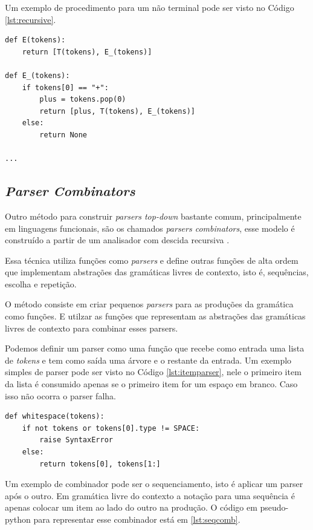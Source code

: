 Um exemplo de procedimento para um não terminal pode ser visto no Código \ref{lst:recursive}.

\begin{lstlisting}[caption=Exemplo de procedimento em pseudo-python para um não terminal,label={lst:recursive}]
def E(tokens):
    return [T(tokens), E_(tokens)]

def E_(tokens):
    if tokens[0] == "+":
        plus = tokens.pop(0)
        return [plus, T(tokens), E_(tokens)]
    else:
        return None

...
\end{lstlisting}


\subsection{\textit{Parser Combinators}}

Outro método para construir \textit{parsers top-down} bastante comum, 
principalmente em linguagens funcionais, são os chamados \textit{parsers combinators},
esse modelo é construído a partir de um analisador com descida recursiva \cite{hutton1996monadic}.

Essa técnica utiliza funções como \textit{parsers} e define outras funções de alta ordem que
implementam abstrações das gramáticas livres de contexto, 
isto é, sequências, escolha e repetição.

O método consiste em criar pequenos \textit{parsers} para as produções da gramática como funções. 
E utilzar as funções que representam as abstrações das gramáticas livres de contexto 
para combinar esses parsers.

Podemos definir um parser como uma função que recebe como entrada uma lista de \textit{tokens}
e tem como saída uma árvore e o restante da entrada. Um exemplo simples de parser pode ser
visto no Código \ref{lst:itemparser}, nele o primeiro item da lista é consumido apenas
se o primeiro item for um espaço em branco. Caso isso não ocorra o parser falha.

\begin{lstlisting}[caption=Exemplo de parser em pseudo-python,label={lst:itemparser}]
def whitespace(tokens):
    if not tokens or tokens[0].type != SPACE:
        raise SyntaxError
    else:
        return tokens[0], tokens[1:]
\end{lstlisting}

Um exemplo de combinador pode ser o sequenciamento, isto é aplicar um parser após o outro. 
Em gramática livre do contexto a notação para uma sequência é apenas colocar um 
item ao lado do outro na produção. O código em pseudo-python para representar
esse combinador está em \ref{lst:seqcomb}.

